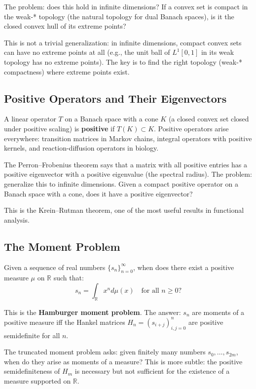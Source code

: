 The problem: does this hold in infinite dimensions? If a convex set is compact in the weak-* topology (the natural topology for dual Banach spaces), is it the closed convex hull of its extreme points?

This is not a trivial generalization: in infinite dimensions, compact convex sets can have no extreme points at all (e.g., the unit ball of $L^1[0,1]$ in its weak topology has no extreme points). The key is to find the right topology (weak-* compactness) where extreme points exist.

\subsection{Positive Operators and Their Eigenvectors}

A linear operator $T$ on a Banach space with a cone $K$ (a closed convex set closed under positive scaling) is \textbf{positive} if $T(K) \subset K$. Positive operators arise everywhere: transition matrices in Markov chains, integral operators with positive kernels, and reaction-diffusion operators in biology.

The Perron--Frobenius theorem says that a matrix with all positive entries has a positive eigenvector with a positive eigenvalue (the spectral radius). The problem: generalize this to infinite dimensions. Given a compact positive operator on a Banach space with a cone, does it have a positive eigenvector?

This is the Krein--Rutman theorem, one of the most useful results in functional analysis.

\subsection{The Moment Problem}

Given a sequence of real numbers $\{s_n\}_{n=0}^\infty$, when does there exist a positive measure $\mu$ on $\mathbb{R}$ such that:
\[
s_n = \int_{\mathbb{R}} x^n d\mu(x) \quad \text{for all } n \geq 0?
\]

This is the \textbf{Hamburger moment problem}. The answer: $s_n$ are moments of a positive measure iff the Hankel matrices $H_n = (s_{i+j})_{i,j=0}^n$ are positive semidefinite for all $n$.

The truncated moment problem asks: given finitely many numbers $s_0,\dots,s_{2m}$, when do they arise as moments of a measure? This is more subtle: the positive semidefiniteness of $H_m$ is necessary but not sufficient for the existence of a measure supported on $\mathbb{R}$.

